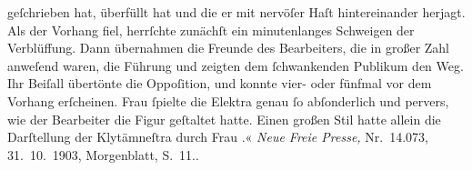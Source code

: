 {{{                        geſchrieben hat, überfüllt hat und die er mit nervöſer Haſt hintereinander
                        herjagt. Als der Vorhang fiel, herrſchte zunächſt ein minutenlanges
                        Schweigen der Verblüffung. Dann übernahmen die Freunde des Bearbeiters, die
                        in großer Zahl anweſend waren, die Führung und zeigten dem ſchwankenden
                        Publikum den Weg. Ihr Beiſall übertönte die Oppoſition, und
                            konnte vier- oder fünfmal vor dem Vorhang
                           erſcheinen. Frau  ſpielte die Elektra genau ſo
                        abſonderlich und pervers, wie der Bearbeiter die Figur geſtaltet hatte.
                        Einen großen Stil hatte allein die Darſtellung der Klytämneſtra durch Frau
                           .« \emph{Neue
                           Freie Presse,} Nr. 14.073, 31. 10. 1903,
                        Morgenblatt, S. 11.}}}\label{K_L01334-1}.\pend
           \endnumbering{}  
      